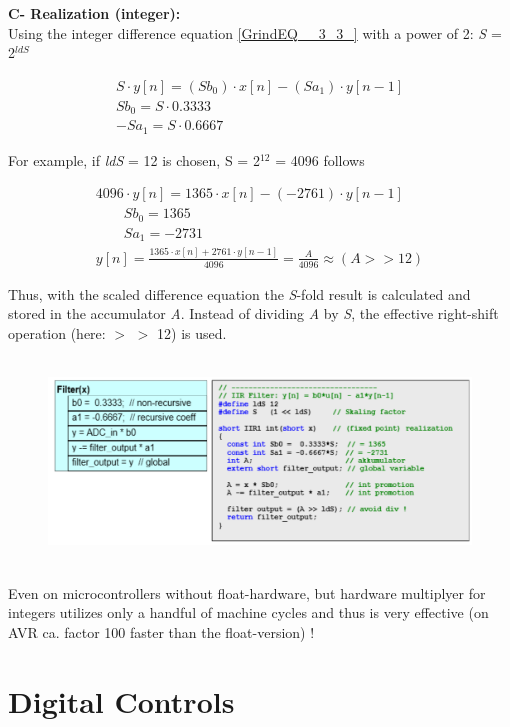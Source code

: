 {\rot\bf C- Realization (integer): } \\

Using the integer difference equation \eqref{GrindEQ__3_3_} with a power of 2: \textit{S} = 2\textit{${}^{ldS\ }$}

\[\begin{array}{l} {S\cdot y[n]=(Sb_{0} )\cdot x[n]-(Sa_{1} )\cdot y[n-1]} \\ {Sb_{0} =S\cdot 0.3333} \\ {-Sa_{1} =S\cdot 0.6667} \end{array}\] 
 
For example, if \textit{ldS} = 12 is chosen, S = 2${}^{12}$ = 4096 follows

\[\begin{array}{l} {4096\cdot y[n]=1365\cdot x[n]-(-2761)\cdot y[n-1]} \\ {\qquad Sb_{0} =1365} \\ {\qquad Sa_{1} =-2731} \\ {y[n]=\frac{1365\cdot x[n]+2761\cdot y[n-1]}{4096} =\frac{A}{4096} \approx (A>>12)} \end{array}\] 

Thus, with the scaled difference equation the \textit{S}-fold result is calculated and stored in the accumulator \textit{A}. Instead of dividing \textit{A} by \textit{S}, the effective right-shift operation (here: $\mathrm{>}$ $\mathrm{>}$ 12) is used.

	\begin{figure}[h]
    \centering
    \includegraphics[width=14cm, height=5.5cm]{Images/image147.png}
    \label{fig:Fig 100}
    \end{figure}

Even on microcontrollers without float-hardware, but hardware multiplyer for integers utilizes only a handful of machine cycles and thus is very effective (on AVR ca. factor 100 faster than the float-version) !
\newpage
\section{Digital Controls}

